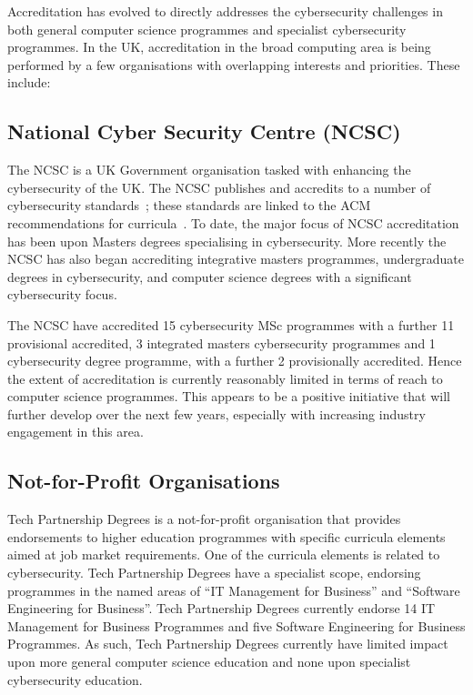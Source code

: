 \documentclass[conference]{IEEEtran}
\begin{document}
{Accreditation has evolved to directly addresses the cybersecurity challenges in both general computer science programmes and specialist cybersecurity programmes. In the UK, accreditation in the broad computing area is being performed by a few organisations with overlapping interests and priorities. These include:

\subsection{National Cyber Security Centre (NCSC)}

The NCSC is a UK Government organisation tasked with enhancing the cybersecurity of the UK. The NCSC publishes and accredits to a number of cybersecurity standards~\cite{NCSC2017}; these standards are linked to the ACM recommendations for curricula~\cite{ACM2013a}. To date, the major focus of NCSC accreditation has been upon Masters degrees specialising in cybersecurity. More recently the NCSC has also began accrediting integrative masters programmes, undergraduate degrees in cybersecurity, and computer science degrees with a significant cybersecurity focus.

The NCSC have accredited 15 cybersecurity MSc programmes with a further 11 provisional accredited, 3 integrated masters cybersecurity programmes and 1 cybersecurity degree programme, with a further 2 provisionally accredited. Hence the extent of accreditation is currently reasonably limited in terms of reach to computer science programmes. This appears to be a positive initiative that will further develop over the next few years, especially with increasing industry engagement in this area.

\subsection{Not-for-Profit Organisations}

Tech Partnership Degrees is a not-for-profit organisation that provides endorsements to higher education programmes with specific curricula elements aimed at job market requirements. One of the curricula elements is related to cybersecurity. Tech Partnership Degrees have a specialist scope, endorsing programmes in the named areas of ``IT Management for Business'' and ``Software Engineering for Business''. Tech Partnership Degrees currently endorse 14 IT Management for Business Programmes and five Software Engineering for Business Programmes. As such, Tech Partnership Degrees currently have limited impact upon more general computer science education and none upon specialist cybersecurity education. 

}
\end{document}
